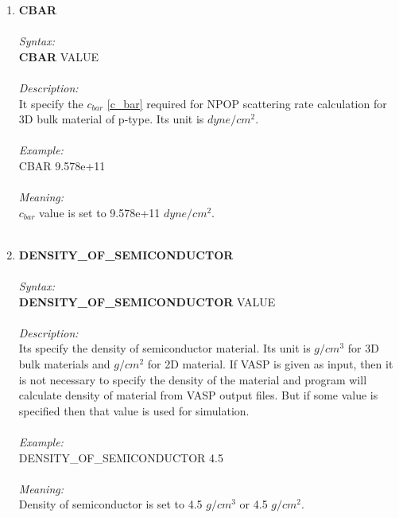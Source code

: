 \documentclass[12pt]{article}
\begin{document}
\begin{enumerate}
    \item \textbf{CBAR} \\ \\
    \textit{Syntax:} \\
    \textbf{CBAR} VALUE \\ \\
    \textit{Description:} \\
    It specify the $c_{bar}$ \ref{c_bar} required for NPOP scattering rate calculation for 3D bulk material of p-type. Its unit is $dyne/cm^2$. \\ \\
    \textit{Example:} \\
    CBAR 9.578e+11 \\ \\
    \textit{Meaning:} \\ 
    $c_{bar}$ value is set to 9.578e+11 $dyne/cm^2$. \\ \\
    

    \item \textbf{DENSITY\_OF\_SEMICONDUCTOR} \\ \\
    \textit{Syntax:} \\
    \textbf{DENSITY\_OF\_SEMICONDUCTOR} VALUE \\ \\
    \textit{Description:} \\
    Its specify the density of semiconductor material. Its unit is $g/cm^3$ for 3D bulk materials and $g/cm^2$ for 2D material. If VASP is given as input, then it is not necessary to specify the density of the material and program will calculate density of material from VASP output files. But if some value is specified then that value is used for simulation. \\ \\
    \textit{Example:} \\
    DENSITY\_OF\_SEMICONDUCTOR 4.5 \\ \\
    \textit{Meaning:} \\ 
    Density of semiconductor is set to 4.5 $g/cm^3$ or 4.5 $g/cm^2$. \\ \\


\end{enumerate}
\end{document}
